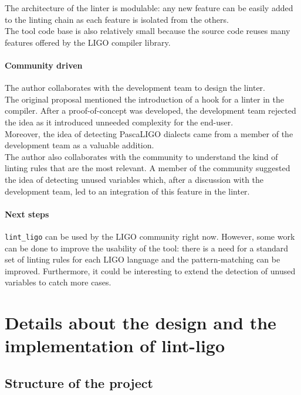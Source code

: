 \documentclass[10pt,a4paper]{article}
\begin{document}
The architecture of the linter is modulable: any new feature can be easily added to the linting chain as each feature is isolated from the others.\\
The tool code base is also relatively small because the source code reuses many features offered by the LIGO compiler library.

\paragraph{Community driven}
The author collaborates with the development team to design the linter.\\
The original proposal mentioned the introduction of a hook for a linter in the compiler. After a proof-of-concept was developed, the development team rejected the idea as it introduced unneeded complexity for the end-user.\\
Moreover, the idea of detecting PascaLIGO dialects came from a member of the development team as a valuable addition.\\

The author also collaborates with the community to understand the kind of linting rules that are the most relevant. A member of the community suggested the idea of detecting unused variables which, after a discussion with the development team, led to an integration of this feature in the linter.

\paragraph{Next steps}

\verb|lint_ligo| can be used by the LIGO community right now.
However, some work can be done to improve the usability of the tool: there is a need for a standard set of linting rules for each LIGO language and the pattern-matching can be improved.
Furthermore, it could be interesting to extend the detection of unused variables to catch more cases.

\section{Details about the design and the implementation of lint-ligo}

\subsection{Structure of the project}
\end{document}
